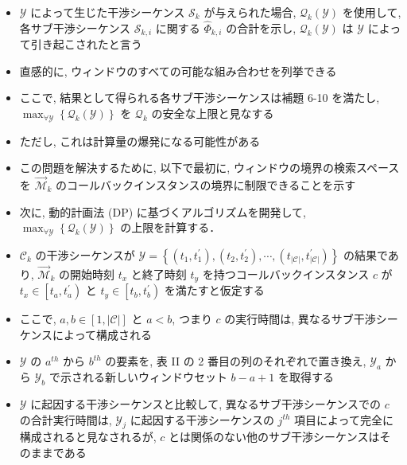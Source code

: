 \begin{frame}{}
    \begin{itemize}
        \item $\mathcal{Y}$ によって生じた干渉シーケンス $\mathcal{S}_{k}$ が与えられた場合, $\mathcal{Q}_{k}(\mathcal{Y})$ を使用して, 各サブ干渉シーケンス $\mathcal{S}_{k, i}$ に関する $\hat{\Phi}_{k, i}$ の合計を示し, $\mathcal{Q}_{k}(\mathcal{Y})$ は $\mathcal{Y}$ によって引き起こされたと言う
        \item 直感的に, ウィンドウのすべての可能な組み合わせを列挙できる
        \item ここで, 結果として得られる各サブ干渉シーケンスは補題 6-10 を満たし, $\max _{\forall \mathcal{Y}}\left\{\mathcal{Q}_{k}(\mathcal{Y})\right\}$ を $\mathcal{Q}_{k}$ の安全な上限と見なする
        \item ただし, これは計算量の爆発になる可能性がある
        \item この問題を解決するために, 以下で最初に, ウィンドウの境界の検索スペースを $\overrightarrow{\mathcal{M}}_{k}$ のコールバックインスタンスの境界に制限できることを示す
        \item 次に, 動的計画法 (DP) に基づくアルゴリズムを開発して, $\max _{\forall \mathcal{Y}}\left\{\mathcal{Q}_{k}(\mathcal{Y})\right\}$ の上限を計算する．
    \end{itemize}
\end{frame}

\begin{frame}{}
    \begin{itemize}
        \item $\mathcal{C}_{k}$ の干渉シーケンスが $\mathcal{Y}=\left\{\left(t_{1}, t_{1}^{\prime}\right),\left(t_{2}, t_{2}^{\prime}\right), \cdots,\left(t_{|\mathcal{C}|}, t_{|\mathcal{C}|}^{\prime}\right)\right\}$ の結果であり, $\overrightarrow{\mathcal{M}}_{k}$ の開始時刻 $t_{x}$ と終了時刻 $t_{y}$ を持つコールバックインスタンス $c$ が $t_{x} \in\left[t_{a}, t_{a}^{\prime}\right)$ と $t_{y} \in\left[t_{b}, t_{b}^{\prime}\right)$ を満たすと仮定する
        \item ここで, $a, b \in[1,|\mathcal{C}|]$ と $a<b$, つまり $c$ の実行時間は, 異なるサブ干渉シーケンスによって構成される
        \item $\mathcal{Y}$ の $a^{t h}$ から $b^{t h}$ の要素を, 表 II の 2 番目の列のそれぞれで置き換え, $\mathcal{Y}_{a}$ から $\mathcal{Y}_{b}$ で示される新しいウィンドウセット $b-a+1$ を取得する
        \item $\mathcal{Y}$ に起因する干渉シーケンスと比較して, 異なるサブ干渉シーケンスでの $c$ の合計実行時間は, $\mathcal{Y}_{j}$ に起因する干渉シーケンスの $j^{t h}$ 項目によって完全に構成されると見なされるが, $c$ とは関係のない他のサブ干渉シーケンスはそのままである
    \end{itemize}
\end{frame}

